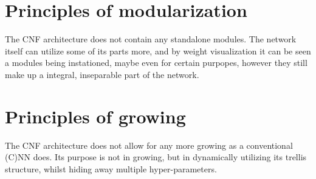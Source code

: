 \documentclass[a4paper,twocolumn]{article}
\begin{document}
\section{Principles of modularization}
The CNF architecture does not contain any standalone modules. The network itself can utilize some of its parts more, and by weight visualization it can be seen a modules being instationed, maybe even for certain purpopes, however they still make up a integral, inseparable part of the network.

\section{Principles of growing}
The CNF architecture does not allow for any more growing as a conventional (C)NN does. Its purpose is not in growing, but in dynamically utilizing its trellis structure, whilst hiding away multiple hyper-parameters.
\end{document}
